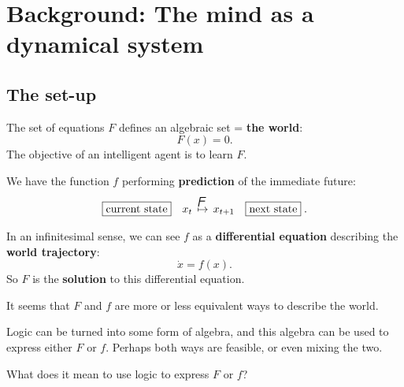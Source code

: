 \chapter{Background: The mind as a dynamical system}\label{chap:background1}

\section{The set-up}

The set of equations $F$ defines an algebraic set = \textbf{the world}:
\begin{equation}
F(x) = 0 .
\end{equation}
The objective of an intelligent agent is to learn $F$.

We have the function $f$ performing \textbf{prediction} of the immediate future:
\begin{equation}
\boxed{\mbox{current state}} \quad x_t \stackrel{\squareF}{\mapsto} x_{t+1} \quad \boxed{\mbox{next state}} \;.
\end{equation}

In an infinitesimal sense, we can see $f$ as a \textbf{differential equation} describing the \textbf{world trajectory}:
\begin{equation}
\dot{x} = f(x) .
\end{equation}
So $F$ is the \textbf{solution} to this differential equation.

It seems that $F$ and $f$ are more or less equivalent ways to describe the world.

Logic can be turned into some form of algebra, and this algebra can be used to express either $F$ or $f$.  Perhaps both ways are feasible, or even mixing the two.

What does it mean to use logic to express $F$ or $f$?

